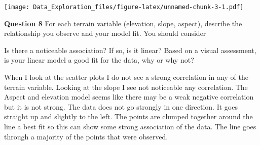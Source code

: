 \documentclass[
]{article}
\begin{document}
\texttt{[image: Data\_Exploration\_files/figure-latex/unnamed-chunk-3-1.pdf]}

\textbf{Question 8} For each terrain variable (elevation, slope,
aspect), describe the relationship you observe and your model fit. You
should consider

Is there a noticeable association? If so, is it linear? Based on a
visual assessment, is your linear model a good fit for the data, why or
why not?

When I look at the scatter plots I do not see a strong correlation in
any of the terrain variable. Looking at the slope I see not noticeable
any correlation. The Aspect and elevation model seems like there may be
a weak negative correlation but it is not strong. The data does not go
strongly in one direction. It goes straight up and slightly to the left.
The points are clumped together around the line a best fit so this can
show some strong association of the data. The line goes through a
majority of the points that were observed.
\end{document}
